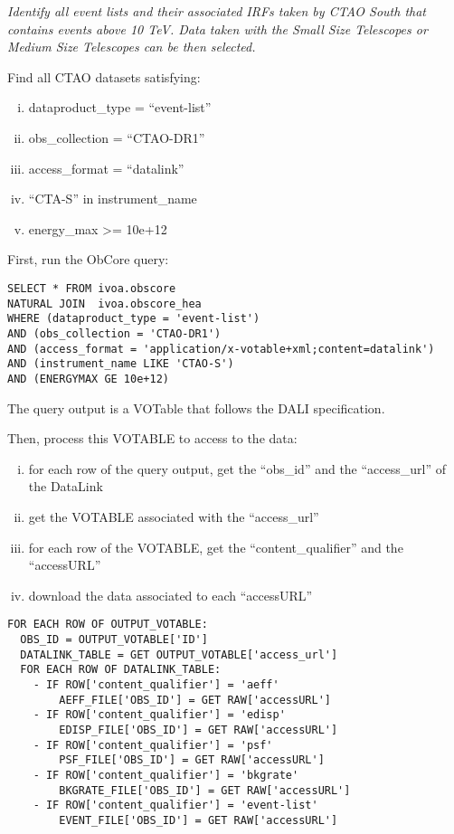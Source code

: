 {\em Identify all event lists and their associated \glspl{IRF} taken by CTAO South that contains events above 10 TeV. Data taken with the Small Size Telescopes or Medium Size Telescopes can be then selected. \/}

\medskip
\noindent Find all CTAO datasets satisfying:
\begin{enumerate}[(i)]
  \item dataproduct\_type = ``event-list''
  \item obs\_collection = ``CTAO-DR1''
  \item access\_format = ``datalink''
  \item ``CTA-S'' in instrument\_name
  \item energy\_max >= 10e+12
\end{enumerate}

First, run the ObCore query:
\begin{verbatim}
SELECT * FROM ivoa.obscore
NATURAL JOIN  ivoa.obscore_hea
WHERE (dataproduct_type = 'event-list')
AND (obs_collection = 'CTAO-DR1')
AND (access_format = 'application/x-votable+xml;content=datalink')
AND (instrument_name LIKE 'CTAO-S')
AND (ENERGYMAX GE 10e+12)
\end{verbatim}
The query output is a VOTable that follows the DALI specification.

\medskip
\noindent Then, process this VOTABLE to access to the data:
\begin{enumerate}[(i)]
  \item for each row of the query output, get the ``obs\_id'' and the ``access\_url'' of the DataLink
  \item get the VOTABLE associated with the ``access\_url''
  \item for each row of the VOTABLE, get the ``content\_qualifier'' and the ``accessURL''
  \item download the data associated to each ``accessURL''
\end{enumerate}

\begin{verbatim}
FOR EACH ROW OF OUTPUT_VOTABLE:
  OBS_ID = OUTPUT_VOTABLE['ID']
  DATALINK_TABLE = GET OUTPUT_VOTABLE['access_url']
  FOR EACH ROW OF DATALINK_TABLE:
    - IF ROW['content_qualifier'] = 'aeff'
    	AEFF_FILE['OBS_ID'] = GET RAW['accessURL']
    - IF ROW['content_qualifier'] = 'edisp'
    	EDISP_FILE['OBS_ID'] = GET RAW['accessURL']
    - IF ROW['content_qualifier'] = 'psf'
    	PSF_FILE['OBS_ID'] = GET RAW['accessURL']
    - IF ROW['content_qualifier'] = 'bkgrate'
    	BKGRATE_FILE['OBS_ID'] = GET RAW['accessURL']
    - IF ROW['content_qualifier'] = 'event-list'
    	EVENT_FILE['OBS_ID'] = GET RAW['accessURL']
\end{verbatim}

